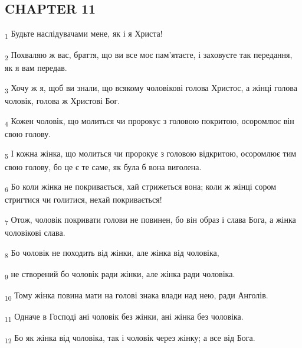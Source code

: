 \subsection{CHAPTER 11}
\begin{tcolorbox}
\textsubscript{1} Будьте наслідувачами мене, як і я Христа!
\end{tcolorbox}
\begin{tcolorbox}
\textsubscript{2} Похваляю ж вас, браття, що ви все моє пам'ятаєте, і заховуєте так передання, як я вам передав.
\end{tcolorbox}
\begin{tcolorbox}
\textsubscript{3} Хочу ж я, щоб ви знали, що всякому чоловікові голова Христос, а жінці голова чоловік, голова ж Христові Бог.
\end{tcolorbox}
\begin{tcolorbox}
\textsubscript{4} Кожен чоловік, що молиться чи пророкує з головою покритою, осоромлює він свою голову.
\end{tcolorbox}
\begin{tcolorbox}
\textsubscript{5} І кожна жінка, що молиться чи пророкує з головою відкритою, осоромлює тим свою голову, бо це є те саме, як була б вона виголена.
\end{tcolorbox}
\begin{tcolorbox}
\textsubscript{6} Бо коли жінка не покривається, хай стрижеться вона; коли ж жінці сором стригтися чи голитися, нехай покривається!
\end{tcolorbox}
\begin{tcolorbox}
\textsubscript{7} Отож, чоловік покривати голови не повинен, бо він образ і слава Бога, а жінка чоловікові слава.
\end{tcolorbox}
\begin{tcolorbox}
\textsubscript{8} Бо чоловік не походить від жінки, але жінка від чоловіка,
\end{tcolorbox}
\begin{tcolorbox}
\textsubscript{9} не створений бо чоловік ради жінки, але жінка ради чоловіка.
\end{tcolorbox}
\begin{tcolorbox}
\textsubscript{10} Тому жінка повина мати на голові знака влади над нею, ради Анголів.
\end{tcolorbox}
\begin{tcolorbox}
\textsubscript{11} Одначе в Господі ані чоловік без жінки, ані жінка без чоловіка.
\end{tcolorbox}
\begin{tcolorbox}
\textsubscript{12} Бо як жінка від чоловіка, так і чоловік через жінку; а все від Бога.
\end{tcolorbox}
